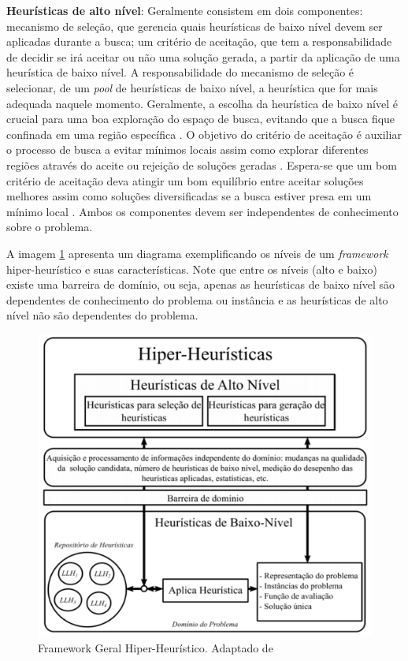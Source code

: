 \textbf{Heurísticas de alto nível}: Geralmente consistem em dois componentes: mecanismo de seleção, que gerencia quais heurísticas de baixo nível devem ser aplicadas durante a busca; um critério de aceitação, que tem a responsabilidade de decidir se irá aceitar ou não uma solução gerada, a partir da aplicação de uma heurística de baixo nível. A responsabilidade do mecanismo de seleção é selecionar, de um \textit{pool} de heurísticas de baixo nível, a heurística que for mais adequada naquele momento. Geralmente, a escolha da heurística de baixo nível é crucial para uma boa exploração do espaço de busca, evitando que a busca fique confinada em uma região específica \cite{sabar2015automatic}. O objetivo do critério de aceitação é auxiliar o processo de busca a evitar mínimos locais assim como explorar diferentes regiões através do aceite ou rejeição de soluções geradas \cite{chakhlevitch2008hyperheuristics}. Espera-se que um bom critério de aceitação deva atingir um bom equilíbrio entre aceitar soluções melhores assim como soluções diversificadas se a busca estiver presa em um mínimo local \cite{sabar2015automatic}. Ambos os componentes devem ser independentes de conhecimento sobre o problema.

A imagem \ref{img:hiperheuristico} apresenta um diagrama exemplificando os níveis de um \textit{framework} hiper-heurístico e suas características. Note que entre os níveis (alto e baixo) existe uma barreira de domínio, ou seja, apenas as heurísticas de baixo nível são dependentes de conhecimento do problema ou instância e as heurísticas de alto nível não são dependentes do problema. 

\begin{figure}[!htb]
	\centering
	\includegraphics{Imagens/HiperHeuristicas.png}
	\caption{Framework Geral Hiper-Heurístico. Adaptado de \cite{sabar2015automatic}}
	\label{img:hiperheuristico}
\end{figure}


